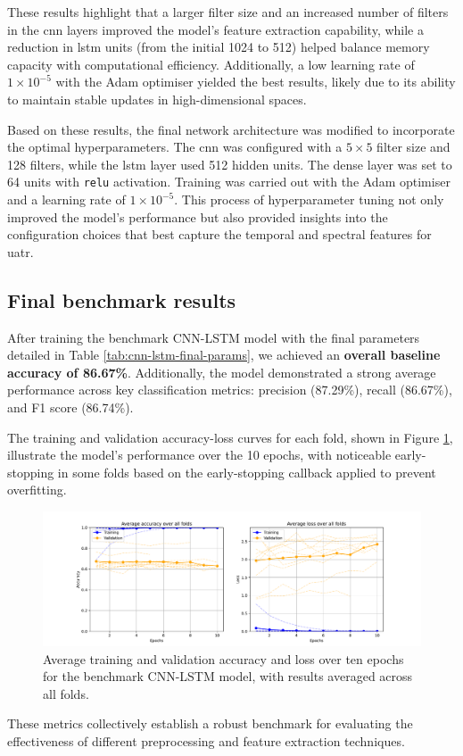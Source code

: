 These results highlight that a larger filter size and an increased number of filters in the \acrshort{cnn} layers improved the model's feature extraction capability, while a reduction in \acrshort{lstm} units (from the initial 1024 to 512) helped balance memory capacity with computational efficiency. Additionally, a low learning rate of $1 \times 10^{-5}$ with the Adam optimiser yielded the best results, likely due to its ability to maintain stable updates in high-dimensional spaces.

Based on these results, the final network architecture was modified to incorporate the optimal hyperparameters. The \acrshort{cnn} was configured with a $5\times5$ filter size and 128 filters, while the \acrshort{lstm} layer used 512 hidden units. The dense layer was set to 64 units with \texttt{relu} activation. Training was carried out with the Adam optimiser and a learning rate of $1 \times 10^{-5}$. This process of hyperparameter tuning not only improved the model's performance but also provided insights into the configuration choices that best capture the temporal and spectral features for \acrlong{uatr}.

\subsection{Final benchmark results}

After training the benchmark CNN-LSTM model with the final parameters detailed in Table \ref{tab:cnn-lstm-final-params}, we achieved an \textbf{overall baseline accuracy of 86.67\%}. Additionally, the model demonstrated a strong average performance across key classification metrics: precision (87.29\%), recall (86.67\%), and F1 score (86.74\%).

The training and validation accuracy-loss curves for each fold, shown in Figure \ref{fig:cnn-lstm-acc-loss-training-plot}, illustrate the model's performance over the 10 epochs, with noticeable early-stopping in some folds based on the early-stopping callback applied to prevent overfitting. 

\begin{figure}[htbp]
    \centering
    \includegraphics[trim={2cm 0 2cm 0},clip,width=\textwidth]{img/ch3/cnn_lstm_acc_loss.pdf}
    \caption{Average training and validation accuracy and loss over ten epochs for the benchmark CNN-LSTM model, with results averaged across all folds.}
    \label{fig:cnn-lstm-acc-loss-training-plot}
\end{figure}

These metrics collectively establish a robust benchmark for evaluating the effectiveness of different preprocessing and feature extraction techniques.